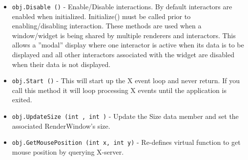 \begin{itemize}
\item  \verb|obj.Disable ()| -  Enable/Disable interactions.  By default interactors are enabled when
 initialized.  Initialize() must be called prior to enabling/disabling
 interaction. These methods are used when a window/widget is being
 shared by multiple renderers and interactors.  This allows a ''modal''
 display where one interactor is active when its data is to be displayed
 and all other interactors associated with the widget are disabled
 when their data is not displayed.

\item  \verb|obj.Start ()| -  This will start up the X event loop and never return. If you
 call this method it will loop processing X events until the
 application is exited.

\item  \verb|obj.UpdateSize (int , int )| -  Update the Size data member and set the associated RenderWindow's
 size.

\item  \verb|obj.GetMousePosition (int x, int y)| -  Re-defines virtual function to get mouse position by querying X-server.

\end{itemize}
